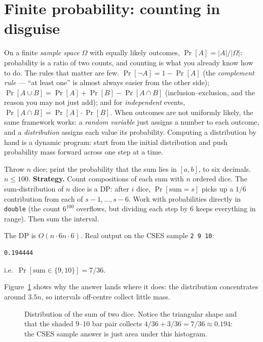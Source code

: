 \section{Finite probability: counting in disguise}\label{sec:finite}
On a finite \emph{sample space} $\Omega$ with equally likely
outcomes, $\Pr[A]=|A|/|\Omega|$: probability is a ratio of two
counts, and counting is what you already know how to do. The
rules that matter are few. $\Pr[\neg A]=1-\Pr[A]$ (the
\emph{complement rule} --- ``at least one'' is almost always
easier from the other side); $\Pr[A\cup B]=\Pr[A]+\Pr[B]-\Pr[A\cap B]$
(inclusion--exclusion, and the reason you may not just add);
and for \emph{independent} events,
$\Pr[A\cap B]=\Pr[A]\cdot\Pr[B]$. When outcomes are not
uniformly likely, the same framework works: a \emph{random
variable} just assigns a number to each outcome, and a
\emph{distribution} assigns each value its probability.
Computing a distribution by hand is a dynamic program:
start from the initial distribution and push probability mass
forward across one step at a time.

\begin{example}
Throw $n$ dice; print the probability that the sum lies in
$[a,b]$, to six decimals. $n\le 100$.
\textbf{Strategy.} Count compositions of each sum with $n$
ordered dice. The sum-distribution of $n$ dice is a DP: after
$i$ dice, $\Pr[\text{sum}=s]$ picks up a $1/6$ contribution
from each of $s-1,\dots,s-6$. Work with probabilities directly
in \texttt{double} (the count $6^{100}$ overflows, but dividing
each step by 6 keeps everything in range). Then sum the
interval.
\end{example}
\begin{solution}

The DP is $O(n\cdot 6n\cdot 6)$. Real output on the CSES sample
\texttt{2 9 10}:
\begin{verbatim}
0.194444
\end{verbatim}
i.e.\ $\Pr[\text{sum}\in\{9,10\}]=7/36$.
\end{solution}

Figure~\ref{fig:dicesum} shows why the answer lands where it
does: the distribution concentrates around $3.5n$, so intervals
off-centre collect little mass.
\begin{figure}[ht]\centering

\caption{Distribution of the sum of two dice. Notice the
triangular shape and that the shaded $9$--$10$ bar pair collects
$4/36+3/36=7/36\approx0.194$: the CSES sample answer is just
area under this histogram.}
\label{fig:dicesum}
\end{figure}

